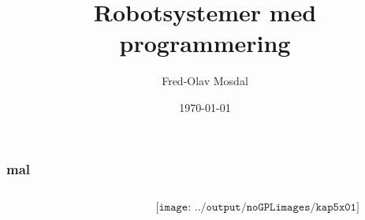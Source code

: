 \documentclass[aspectratio=169,xcolor=dvipsnames]{beamer}
\title[COM]{Robotsystemer med programmering} %
\author[Fred-Olav] {Fred-Olav Mosdal}
\institute[Gand VGS] %
{
    Gand VGS \\
    VG3 Automasjon }
\date{\today} %
\begin{document}
\begin{frame}
\titlepage
\end{frame}





\begin{frame}
	\frametitle{mal}
	\begin{columns}
		\begin{column}{0.5\textwidth}
		\end{column}

		\begin{column}{0.5\textwidth}
	$$\texttt{[image: ../output/noGPLimages/kap5x01]}$$
		\end{column}
	\end{columns}
\end{frame}
\end{document}
